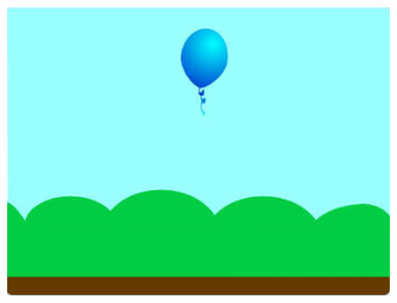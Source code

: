 \documentclass[10pt, a4paper]{article}
\begin{document}
\begin{enumerate}
        \begin{figure}[htbp]
            \begin{minipage}[t]{.35\textwidth}
                \centering
                \begin{minipage}[t]{.5\textwidth}
                    \includegraphics[width=\textwidth]{1-1.png}
                \end{minipage}
                \begin{minipage}[t]{.45\textwidth}

\end{minipage}
\end{minipage}
\end{figure}
\end{enumerate}
\end{document}
